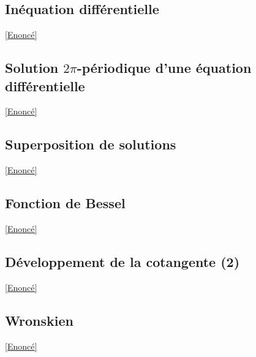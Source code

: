 \documentclass{book}
\begin{document}
	\subsection{Inéquation différentielle}\label{sec:inequation-differentielle}
		\textcolor{blue}{\hyperref[Inéquation différentielle]{[Enoncé]}}\\
	
	\subsection{Solution $2\pi$-périodique d'une équation différentielle}\label{sec:solution-2pi-periodique-dune-equation-differentielle}
		\textcolor{blue}{\hyperref[Solution 2pi-périodique d'une équation différentielle]{[Enoncé]}}\\
	
	\subsection{Superposition de solutions}\label{sec:superposition-de-solutions}
		\textcolor{blue}{\hyperref[Superposition de solutions]{[Enoncé]}}\\
	
	\subsection{Fonction de Bessel}\label{sec:fonction-de-bessel}
		\textcolor{blue}{\hyperref[FOnction de Bessel]{[Enoncé]}}\\
	\subsection{Développement de la cotangente (2)}\label{sec:developpement-de-la-cotangente-2}
		\textcolor{blue}{\hyperref[Développement de la cotangente 2]{[Enoncé]}}\\
	\subsection{Wronskien}\label{sec:wronskien}
		\textcolor{blue}{\hyperref[Wronskien]{[Enoncé]}}\\
	
\end{document}
